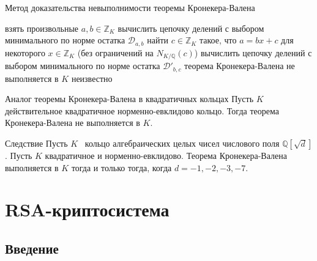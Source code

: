 \documentclass[8pt, xcolor=x11names]{beamer}
\begin{document}
\begin{frame}
    \begin{block}{Метод доказательства невыполнимости теоремы Кронекера-Валена}
        \begin{algorithmic}[1]
            \State взять произвольные $a, b\in\mathbb{Z}_K$
            \State вычислить цепочку делений с выбором минимального по норме остатка $\mathcal{D}_{a, b}$
            \State найти $c\in\mathbb{Z}_K$ такое, что $a = bx+c$ для некоторого $x\in\mathbb{Z}_K$ (без ограничений на $N_{K/\mathbb{Q}}(c)$)
            \State вычислить цепочку делений с выбором минимального по норме остатка $\mathcal{D}'_{b,c}$
                \State теорема Кронекера-Валена не выполняется в $K$
            \Else
                \State неизвестно
            \EndIf
        \end{algorithmic}
    \end{block}

    \begin{block}{Аналог теоремы Кронекера-Валена в квадратичных кольцах}
        Пусть $K$ действительное квадратичное норменно-евклидово кольцо.
        Тогда теорема Кронекера-Валена не выполняется в $K$.
    \end{block}

    \begin{block}{Следствие}
        Пусть $K$ \textendash\ кольцо алгебраических целых чисел числового поля $\mathbb{Q}[\sqrt{d}]$.
        Пусть $K$ квадратичное и норменно-евклидово.
        Теорема Кронекера-Валена выполняется в $K$ тогда и только тогда, когда $d=-1, -2, -3, -7$.
    \end{block}
\end{frame}

\section{RSA-криптосистема}

\subsection{Введение}
\end{document}
